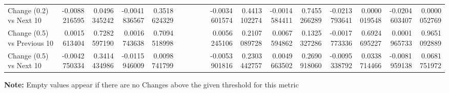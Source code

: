 \begin{table*}
{\begin{tabular}{|l|n{2}{5}n{2}{5}|n{2}{5}n{2}{5}|n{2}{5}n{2}{5}|n{2}{5}n{2}{5}|n{2}{5}n{2}{5}|n{2}{5}n{2}{5}|n{2}{5}n{2}{5}|n{2}{5}n{2}{5}|}
Change (0.2) vs Next 10  & -0.0088216595 & 0.0496345242 & -0.0041836567 & 0.3518624329 &               &              &               &              & -0.0034601574 & 0.4413102274 & -0.0014584411 & 0.7455266289 & -0.0213793641 & 0.0000019548 & -0.0204603407 & 0.0000052769 \\
Change (0.5) vs Previous 10  & 0.0015613404  & 0.7282597190 & 0.0016743638  & 0.7094518998 &               &              &               &              & 0.0056245106  & 0.2107089728 & 0.0067594862  & 0.1325327286 & -0.0017773336 & 0.6924695227 & 0.0001965733  & 0.9651092889 \\
Change (0.5) vs Next 10  & -0.0042750334 & 0.3414434986 & -0.0115946009 & 0.0098741799 &               &              &               &              & -0.0053901816 & 0.2303442757 & 0.0049663502  & 0.2690918060 & -0.0095338792 & 0.0338714466 & -0.0081959138 & 0.0681751972
\\
\hline      
\end{tabular}
}

\begin{flushleft}
\small
\hskip0.65cm \textbf{Note:} Empty values appear if there are no Changes above the given threshold for this metric
\end{flushleft} 
\end{table*}
